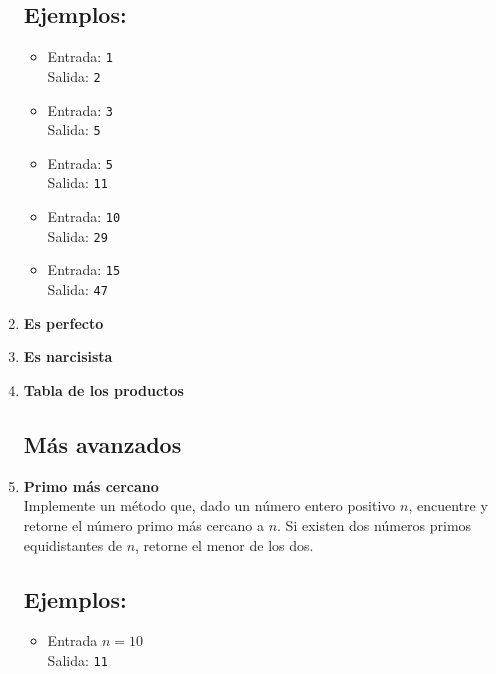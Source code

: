 \begin{enumerate}
    \subsection*{Ejemplos:}
    \begin{itemize} 
        \item Entrada: \texttt{1}\\ 
        Salida: \texttt{2}
        \item Entrada: \texttt{3}\\
        Salida: \texttt{5}
    
        \item Entrada: \texttt{5}\\
              Salida: \texttt{11}
        
        \item Entrada: \texttt{10}\\
              Salida: \texttt{29}
        
        \item Entrada: \texttt{15}\\
              Salida: \texttt{47}
    \end{itemize}
    
    \item \textbf{Es perfecto}\\
    

    \item \textbf{Es narcisista}\\
    

    \item \textbf{Tabla de los productos}
    

\subsection*{Más avanzados}
    \item \textbf{Primo más cercano}\\
    Implemente un método que, dado un número entero positivo \( n \), encuentre y retorne el número primo más cercano a \( n \). Si existen dos números primos equidistantes de \( n \), retorne el menor de los dos. 
    \subsection*{Ejemplos:}
    \begin{itemize}
        \item Entrada \( n = 10 \)\\
        Salida: \texttt{11}
    

\end{itemize}
\end{enumerate}
